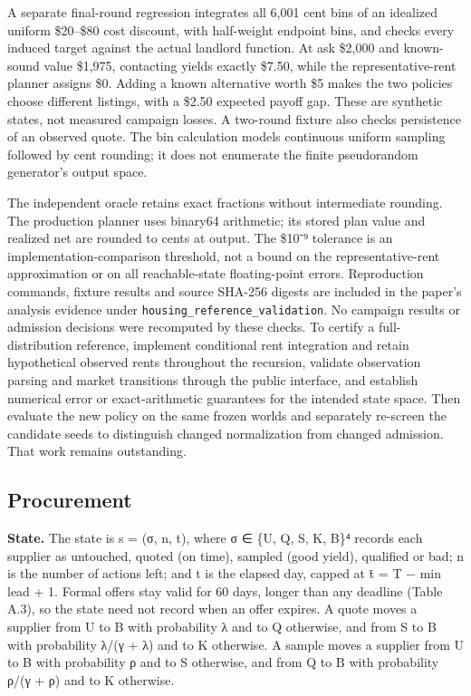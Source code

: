 A separate final-round regression integrates all 6,001 cent bins of an idealized uniform \$20--\$80 cost discount,
with half-weight endpoint bins, and checks every induced target against the actual landlord function. At ask
\$2,000 and known-sound value \$1,975, contacting yields exactly \$7.50, while the representative-rent planner assigns
\$0. Adding a known alternative worth \$5 makes the two policies choose different listings, with a \$2.50 expected
payoff gap. These are synthetic states, not measured campaign losses. A two-round fixture also checks persistence
of an observed quote. The bin calculation models continuous uniform sampling followed by cent rounding; it does
not enumerate the finite pseudorandom generator's output space.

The independent oracle retains exact fractions without intermediate rounding. The production planner uses
binary64 arithmetic; its stored plan value and realized net are rounded to cents at output. The \$10⁻⁹ tolerance
is an implementation-comparison threshold, not a bound on the representative-rent approximation or on all
reachable-state floating-point errors. Reproduction commands, fixture results and source SHA-256 digests are
included in the paper's analysis evidence under \texttt{housing\_\allowbreak{}reference\_\allowbreak{}validation}. No campaign results or admission
decisions were recomputed by these checks. To certify a full-distribution reference, implement conditional rent
integration and retain hypothetical observed rents throughout the recursion, validate observation parsing and
market transitions through the public interface, and establish numerical error or exact-arithmetic guarantees
for the intended state space. Then evaluate the new policy on the same frozen worlds and separately re-screen
the candidate seeds to distinguish changed normalization from changed admission. That work remains outstanding.

\subsection{Procurement}\label{procurement}

\textbf{State.} The state is s = (σ, n, t), where σ ∈ \{U, Q, S, K, B\}⁴ records each supplier as untouched, quoted (on
time), sampled (good yield), qualified or bad; n is the number of actions left; and t is the elapsed day, capped at
t̄ = T − min lead + 1. Formal offers stay valid for 60 days, longer than any deadline (Table A.3), so the state
need not record when an offer expires. A quote moves a supplier from U to B with probability λ and to Q otherwise, and from S to B
with probability λ/(γ + λ) and to K otherwise. A sample moves a supplier from U to B with probability ρ and to S
otherwise, and from Q to B with probability ρ/(γ + ρ) and to K otherwise.

